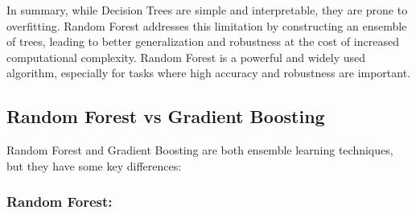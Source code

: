 \documentclass[
]{book}
\begin{document}
In summary, while Decision Trees are simple and interpretable, they are prone to overfitting. Random Forest addresses this limitation by constructing an ensemble of trees, leading to better generalization and robustness at the cost of increased computational complexity. Random Forest is a powerful and widely used algorithm, especially for tasks where high accuracy and robustness are important.

\hypertarget{random-forest-vs-gradient-boosting}{%
\subsection{Random Forest vs Gradient Boosting}\label{random-forest-vs-gradient-boosting}}

Random Forest and Gradient Boosting are both ensemble learning techniques, but they have some key differences:

\hypertarget{random-forest-1}{%
\subsubsection{Random Forest:}\label{random-forest-1}}
\end{document}
